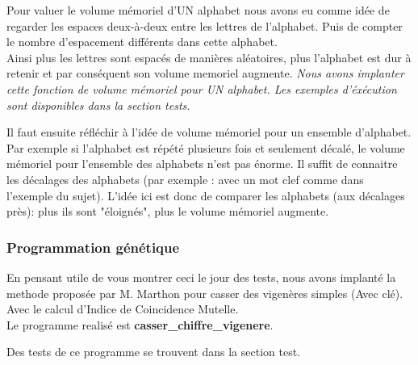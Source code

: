\documentclass[a4paper, 11pt]{article}
\begin{document}
Pour valuer le volume mémoriel d'UN alphabet nous avons eu comme idée
de regarder les espaces deux-à-deux entre les lettres de
l'alphabet. Puis de compter le nombre d'espacement différents dans
cette alphabet.\\
Ainsi plus les lettres sont espacés de manières aléatoires, plus
l'alphabet est dur à retenir et par conséquent son volume memoriel
augmente.
\textit{Nous avons implanter cette fonction de volume mémoriel pour UN
alphabet. Les exemples d'éxécution sont disponibles dans la section
tests.\\}

Il faut ensuite réfléchir à l'idée de volume mémoriel pour un ensemble
d'alphabet.\\
Par exemple si l'alphabet est répété plusieurs fois et seulement
décalé, le volume mémoriel pour l'ensemble des alphabets n'est pas
énorme. Il suffit de connaitre les décalages des alphabets (par
exemple : avec un mot clef comme dans l'exemple du sujet). L'idée ici
est donc de comparer les alphabets (aux décalages près): plus ils sont "éloignés", plus le
volume mémoriel augmente.



\subsubsection{Programmation génétique}
En pensant utile de vous montrer ceci le jour des tests, nous avons
implanté la methode proposée par M. Marthon pour casser des vigenères
simples (Avec clé). Avec le calcul d'Indice de Coincidence Mutelle. \\

Le programme realisé est \textbf{casser\_chiffre\_vigenere}.

Des tests de ce programme se trouvent dans la section test.\\
\end{document}
